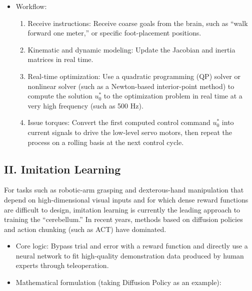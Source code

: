 \begin{itemize}
\tightlist
\item
{}
  Workflow:

  \begin{enumerate}
  \def\labelenumi{\arabic{enumi}.}
  \tightlist
  \item
    Receive instructions: Receive coarse goals from the brain, such as ``walk forward one meter,'' or specific foot-placement positions.
  \item
    Kinematic and dynamic modeling: Update the Jacobian and inertia matrices in real time.
  \item
    Real-time optimization: Use a quadratic programming (QP) solver or nonlinear solver (such as a Newton-based interior-point method) to compute the solution \(u_0^*\) to the optimization problem in real time at a very high frequency (such as 500 Hz).
  \item
    Issue torques: Convert the first computed control command \(u_0^*\) into current signals to drive the low-level servo motors, then repeat the process on a rolling basis at the next control cycle.
  \end{enumerate}
\end{itemize}

\hypertarget{ii.-imitation-learning}{%
\subsection{II. Imitation Learning}\label{ii.-imitation-learning}}

For tasks such as robotic-arm grasping and dexterous-hand manipulation that depend on high-dimensional visual inputs and for which dense reward functions are difficult to design, imitation learning is currently the leading approach to training the ``cerebellum.'' In recent years, methods based on diffusion policies and action chunking (such as ACT) have dominated.

\begin{itemize}
\tightlist
\item
  Core logic: Bypass trial and error with a reward function and directly use a neural network to fit high-quality demonstration data produced by human experts through teleoperation.
\item
{}
  Mathematical formulation (taking Diffusion Policy as an example):
\end{itemize}

